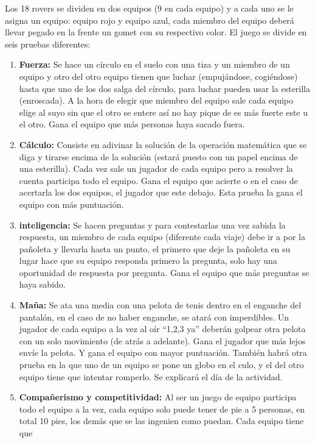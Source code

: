 \documentclass[72pt]{article}
\begin{document}
Los 18 rovers se dividen en dos equipos (9 en cada equipo) y a cada uno
se le asigna un equipo: equipo rojo y equipo azul, cada miembro del
equipo deberá llevar pegado en la frente un gomet con su respectivo
color. El juego se divide en seis pruebas diferentes:
\begin{enumerate}
	\item \textbf{Fuerza:}
		Se hace un círculo en el suelo con una tiza y un miembro de un
		equipo y otro del otro equipo tienen que luchar (empujándose,
		cogiéndose) hasta que uno de los dos salga del círculo, para luchar
		pueden usar la esterilla (enroscada). A la hora de elegir que
		miembro del equipo sale cada equipo elige al suyo sin que el otro se
		entere así no hay pique de es más fuerte este u el otro. Gana el
		equipo que más personas haya sacado fuera.
	\item \textbf{Cálculo:}
		Consiste en adivinar la solución de la operación matemática que se
		diga y tirarse encima de la solución (estará puesto con un papel
		encima de una esterilla). Cada vez sale un jugador de cada equipo
		pero a resolver la cuenta participa todo el equipo. Gana el equipo
		que acierte o en el caso de acertarla los dos equipos, el jugador que
		este debajo. Esta prueba la gana el equipo con más puntuación.
	\item \textbf{inteligencia:}
		Se hacen preguntas y para contestarlas una vez sabida la respuesta,
		un miembro de cada equipo (diferente cada viaje) debe ir a por la
		pañoleta y llevarla hasta un punto, el primero que deje la pañoleta
		en su lugar hace que su equipo responda primero la pregunta, solo
		hay una oportunidad de respuesta por pregunta. Gana el equipo que
		más preguntas se haya sabido.
	\item \textbf{Maña:}
		Se ata una media con una pelota de tenis dentro en el enganche del
		pantalón, en el caso de no haber enganche, se atará con
		imperdibles. Un jugador de cada equipo a la vez al oír “1,2,3 ya”
		deberán golpear otra pelota con un solo movimiento (de atrás a
		adelante). Gana el jugador que más lejos envíe la pelota. Y gana el
		equipo con mayor puntuación.
		También habrá otra prueba en la que uno de un equipo se pone un
		globo en el culo, y el del otro equipo tiene que intentar romperlo. Se
		explicará el día de la actividad.
	\item \textbf{Compañerismo y competitividad:}
		Al ser un juego de equipo participa todo el equipo a la vez, cada
		equipo solo puede tener de pie a 5 personas, en total 10 pies, los
		demás que se las ingenien como puedan. Cada equipo tiene que

\end{enumerate}
\end{document}
